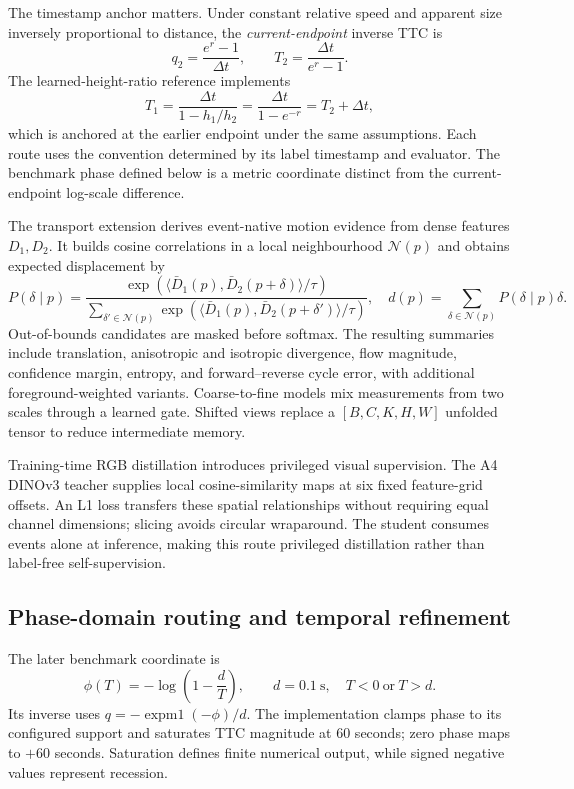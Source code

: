 The timestamp anchor matters. Under constant relative speed and apparent size inversely proportional to distance, the \emph{current-endpoint} inverse TTC is
\begin{equation}
 q_2=\frac{e^r-1}{\Delta t},\qquad T_2=\frac{\Delta t}{e^r-1}.
\label{eq:current-anchor}
\end{equation}
The learned-height-ratio reference implements
\begin{equation}
 T_1=\frac{\Delta t}{1-h_1/h_2}
     =\frac{\Delta t}{1-e^{-r}}=T_2+\Delta t,
\label{eq:start-anchor}
\end{equation}
which is anchored at the earlier endpoint under the same assumptions. Each route uses the convention determined by its label timestamp and evaluator. The benchmark phase defined below is a metric coordinate distinct from the current-endpoint log-scale difference. 

The transport extension derives event-native motion evidence from dense features $D_1,D_2$. It builds cosine correlations in a local neighbourhood $\mathcal N(p)$ and obtains expected displacement by
\begin{equation}
 P(\delta\mid p)=\frac{\exp\!\left(\langle\bar D_1(p),\bar D_2(p+\delta)\rangle/\tau\right)}
 {\sum_{\delta'\in\mathcal N(p)}\exp\!\left(\langle\bar D_1(p),\bar D_2(p+\delta')\rangle/\tau\right)},
 \quad d(p)=\sum_{\delta\in\mathcal N(p)}P(\delta\mid p)\delta.
\end{equation}
Out-of-bounds candidates are masked before softmax. The resulting summaries include translation, anisotropic and isotropic divergence, flow magnitude, confidence margin, entropy, and forward--reverse cycle error, with additional foreground-weighted variants. Coarse-to-fine models mix measurements from two scales through a learned gate. Shifted views replace a $[B,C,K,H,W]$ unfolded tensor to reduce intermediate memory. 

Training-time RGB distillation introduces privileged visual supervision. The A4 DINOv3 teacher \citep{dinov3} supplies local cosine-similarity maps at six fixed feature-grid offsets. An L1 loss transfers these spatial relationships without requiring equal channel dimensions; slicing avoids circular wraparound. The student consumes events alone at inference, making this route privileged distillation rather than label-free self-supervision. 

\subsection{Phase-domain routing and temporal refinement}
\label{sec:phase-refinement}
The later benchmark coordinate is
\begin{equation}
 \phi(T)=-\log\left(1-\frac{d}{T}\right),\qquad d=0.1\ \mathrm{s},
 \quad T<0\ \text{or}\ T>d.
\label{eq:benchmark-phase}
\end{equation}
Its inverse uses $q=-\operatorname{expm1}(-\phi)/d$. The implementation clamps phase to its configured support and saturates TTC magnitude at $60$ seconds; zero phase maps to $+60$ seconds. Saturation defines finite numerical output, while signed negative values represent recession. 

